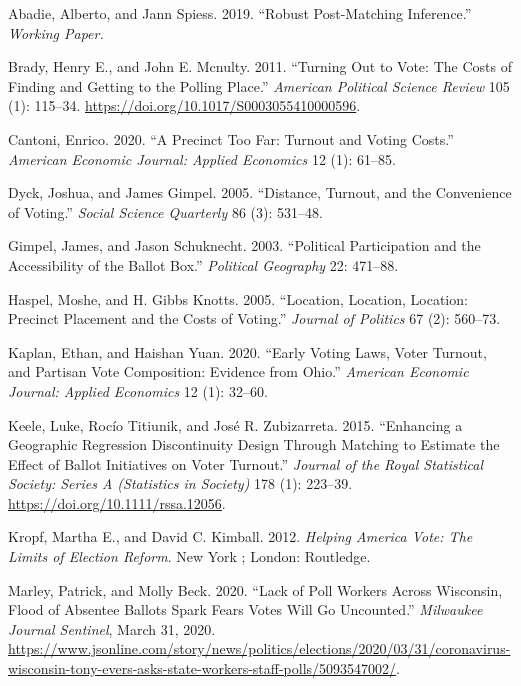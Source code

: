 \documentclass[
  12pt,
]{article}
\newlength{\cslhangindent}
\newenvironment{cslreferences}%
  {\setlength{\parindent}{0pt}%
  \everypar{\setlength{\hangindent}{\cslhangindent}}\ignorespaces}%
  {\par}
\begin{document}
\hypertarget{refs}{}
\begin{cslreferences}
\leavevmode\hypertarget{ref-Abadie2019}{}%
Abadie, Alberto, and Jann Spiess. 2019. ``Robust Post-Matching Inference.'' \emph{Working Paper.}

\leavevmode\hypertarget{ref-Brady2011}{}%
Brady, Henry E., and John E. Mcnulty. 2011. ``Turning Out to Vote: The Costs of Finding and Getting to the Polling Place.'' \emph{American Political Science Review} 105 (1): 115--34. \url{https://doi.org/10.1017/S0003055410000596}.

\leavevmode\hypertarget{ref-Cantoni2020}{}%
Cantoni, Enrico. 2020. ``A Precinct Too Far: Turnout and Voting Costs.'' \emph{American Economic Journal: Applied Economics} 12 (1): 61--85.

\leavevmode\hypertarget{ref-Dyck2005}{}%
Dyck, Joshua, and James Gimpel. 2005. ``Distance, Turnout, and the Convenience of Voting.'' \emph{Social Science Quarterly} 86 (3): 531--48.

\leavevmode\hypertarget{ref-Gimpel2003}{}%
Gimpel, James, and Jason Schuknecht. 2003. ``Political Participation and the Accessibility of the Ballot Box.'' \emph{Political Geography} 22: 471--88.

\leavevmode\hypertarget{ref-Haspel2005}{}%
Haspel, Moshe, and H. Gibbs Knotts. 2005. ``Location, Location, Location: Precinct Placement and the Costs of Voting.'' \emph{Journal of Politics} 67 (2): 560--73.

\leavevmode\hypertarget{ref-Kaplan2020}{}%
Kaplan, Ethan, and Haishan Yuan. 2020. ``Early Voting Laws, Voter Turnout, and Partisan Vote Composition: Evidence from Ohio.'' \emph{American Economic Journal: Applied Economics} 12 (1): 32--60.

\leavevmode\hypertarget{ref-Keele2015}{}%
Keele, Luke, Rocío Titiunik, and José R. Zubizarreta. 2015. ``Enhancing a Geographic Regression Discontinuity Design Through Matching to Estimate the Effect of Ballot Initiatives on Voter Turnout.'' \emph{Journal of the Royal Statistical Society: Series A (Statistics in Society)} 178 (1): 223--39. \url{https://doi.org/10.1111/rssa.12056}.

\leavevmode\hypertarget{ref-Kropf2012}{}%
Kropf, Martha E., and David C. Kimball. 2012. \emph{Helping America Vote: The Limits of Election Reform}. New York ; London: Routledge.

\leavevmode\hypertarget{ref-Marley2020}{}%
Marley, Patrick, and Molly Beck. 2020. ``Lack of Poll Workers Across Wisconsin, Flood of Absentee Ballots Spark Fears Votes Will Go Uncounted.'' \emph{Milwaukee Journal Sentinel}, March 31, 2020. \url{https://www.jsonline.com/story/news/politics/elections/2020/03/31/coronavirus-wisconsin-tony-evers-asks-state-workers-staff-polls/5093547002/}.


\end{cslreferences}
\end{document}

